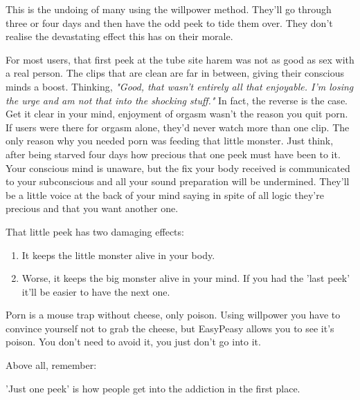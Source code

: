 \documentclass[easypeasy.tex]{subfiles}
\begin{document}
This is the undoing of many using the willpower method. They'll go through three or four days and then have the odd peek to tide them over. They don't realise the devastating effect this has on their morale. 

For most users, that first peek at the tube site harem was not as good as sex with a real person. The clips that are clean are far in between, giving their conscious minds a boost. Thinking, \textit{"Good, that wasn't entirely all that enjoyable. I'm losing the urge and am not that into the shocking stuff."} In fact, the reverse is the case. Get it clear in your mind, enjoyment of orgasm wasn't the reason you quit porn. If users were there for orgasm alone, they'd never watch more than one clip. The only reason why you needed porn was feeding that little monster. Just think, after being starved four days how precious that one peek must have been to it. Your conscious mind is unaware, but the fix your body received is communicated to your subconscious and all your sound preparation will be undermined. They'll be a little voice at the back of your mind saying in spite of all logic they're precious and that you want another one.

That little peek has two damaging effects:
\begin{enumerate}
  \item It keeps the little monster alive in your body.
  \item Worse, it keeps the big monster alive in your mind. If you had the 'last peek' it'll be easier to have the next one.
\end{enumerate}

Porn is a mouse trap without cheese, only poison. Using willpower you have to convince yourself not to grab the cheese, but EasyPeasy allows you to see it's poison. You don't need to avoid it, you just don't go into it.

Above all, remember:

  {\huge 'Just one peek' is how people get into the addiction in the first place.}
\end{document}
